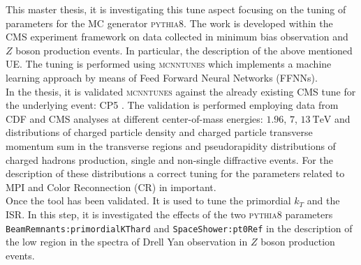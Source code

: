 This master thesis, it is investigating this tune aspect focusing on the tuning of parameters for the MC generator \textsc{pythia8}. The work is developed within the CMS experiment framework on data collected in minimum bias observation and $Z$ boson production events. In particular, the description of the above mentioned UE. The tuning is performed using \textsc{mcnntunes} \cite{MCNNTUNESarticle} which implements a machine learning approach by means of Feed Forward Neural Networks (FFNNs).
\\
In the thesis, it is validated \textsc{mcnntunes} against the already existing CMS tune for the underlying event: CP5 \cite{CPtunes}. The validation is performed employing data from CDF and CMS analyses at different center-of-mass energies: $1.96$, $7$, $13\ \mathrm{TeV}$ and distributions of charged particle density and charged particle transverse momentum  sum in the transverse regions and pseudorapidity distributions of charged hadrons production, single and non-single diffractive events. For the description of these distributions a correct  tuning for the parameters related to MPI and Color Reconnection (CR) in important. 
\\
Once the tool has been validated. It is used to tune the primordial $k_T$ and the ISR. In this step, it is investigated the effects of the two \textsc{pythia8} parameters \texttt{BeamRemnants:primordialKThard} and \texttt{SpaceShower:pt0Ref} in the description of the low region in the spectra of Drell Yan observation in $Z$ boson production events.



 
 
